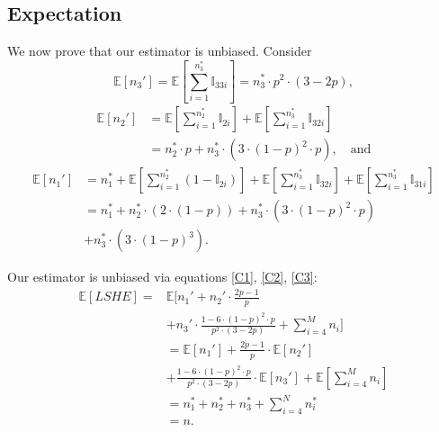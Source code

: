 \documentclass{imsart}
\begin{document}
\subsection{Expectation}
We now prove that our estimator is unbiased. Consider
\begin{equation}
\label{C3}
\mathbb{E}[n_3']= \mathbb{E}[\sum_{i=1}^{n_3^*}{\mathbb{I}_{33i}}]= n_3^* \cdot p^2 \cdot (3-2p),
\end{equation}
\begin{equation}
\label{C2}
\begin{split}
\mathbb{E}[n_2'] &=    \mathbb{E}[\sum_{i=1}^{n_2^*}{\mathbb{I}_{2i}}] + \mathbb{E}[\sum_{i=1}^{n_3^*}{\mathbb{I}_{32i}}]     \\
&= n_2^* \cdot p + n_3^*\cdot (3\cdot(1-p)^2\cdot p), \quad \text{and}
\end{split}
\end{equation}
\begin{equation}
\label{C1}
\begin{split}
\mathbb{E}[n_1']&= n_1^*+
\mathbb{E}[\sum_{i=1}^{n_2^*}{(1-\mathbb{I}_{2i})}] + \mathbb{E}[\sum_{i=1}^{n_3^*}{\mathbb{I}_{32i}}] + \mathbb{E}[\sum_{i=1}^{n_3^*}{\mathbb{I}_{31i}}]\\
&= n_1^* + n_2^* \cdot(2\cdot(1-p)) + n_3^* \cdot (3\cdot (1-p)^2\cdot p) \\
&+ n_3^* \cdot (3\cdot(1-p)^3 ).
\end{split}
\end{equation}

Our estimator is unbiased via equations \ref{C1}, \ref{C2}, \ref{C3}:
\begin{equation*}
\begin{split}
\mathbb{E}[LSHE] =&\mathbb{E}[n_1' +  n_2' \cdot \frac{2p-1}{p}  \\
&+ n_3' \cdot \frac{1-6 \cdot (1-p)^2 \cdot p}{p^2 \cdot (3-2p) }
+ \sum_{i=4}^{M} n_i] \\
& = \mathbb{E}[n_1'] +  \frac{2p-1}{p} \cdot \mathbb{E}[n_2']    \\
&+ \frac{1-6 \cdot (1-p)^2 \cdot p}{p^2 \cdot (3-2p)} \cdot \mathbb{E}[n_3']   +  \mathbb{E}[\sum_{i=4}^{M}n_i]\\
& = n_1^* + n_2^* + n_3^* + \sum_{i=4}^{N}n_i^*\\
& = n.
\end{split}
\end{equation*}
\end{document}
